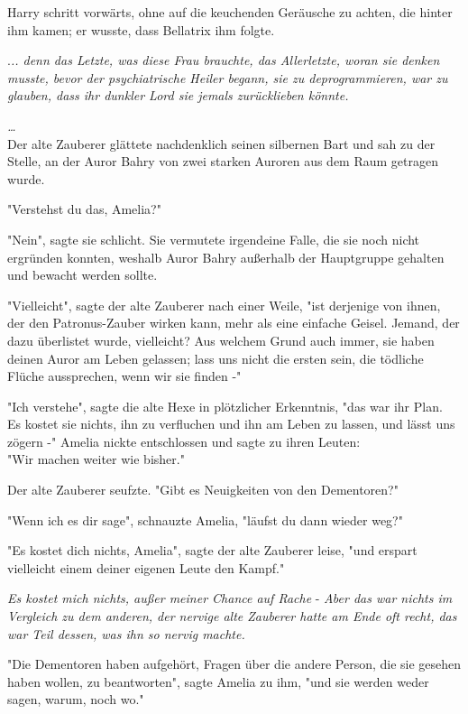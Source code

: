 {Harry schritt vorwärts, ohne auf die keuchenden Geräusche zu achten, die hinter ihm kamen; er wusste, dass Bellatrix ihm folgte.

.\emph{.. denn das Letzte, was diese Frau brauchte, das Allerletzte, woran sie denken musste, bevor der psychiatrische Heiler begann, sie zu deprogrammieren, war zu glauben, dass ihr dunkler Lord sie jemals zurücklieben könnte.}

\emph{…}\\ Der alte Zauberer glättete nachdenklich seinen silbernen Bart und sah zu der Stelle, an der Auror Bahry von zwei starken Auroren aus dem Raum getragen wurde.

"Verstehst du das, Amelia?"

"Nein", sagte sie schlicht. Sie vermutete irgendeine Falle, die sie noch nicht ergründen konnten, weshalb Auror Bahry außerhalb der Hauptgruppe gehalten und bewacht werden sollte.

"Vielleicht", sagte der alte Zauberer nach einer Weile, "ist derjenige von ihnen, der den Patronus-Zauber wirken kann, mehr als eine einfache Geisel. Jemand, der dazu überlistet wurde, vielleicht? Aus welchem Grund auch immer, sie haben deinen Auror am Leben gelassen; lass uns nicht die ersten sein, die tödliche Flüche aussprechen, wenn wir sie finden -"

"Ich verstehe", sagte die alte Hexe in plötzlicher Erkenntnis, "das war ihr Plan.\\ Es kostet sie nichts, ihn zu verfluchen und ihn am Leben zu lassen, und lässt uns zögern -" Amelia nickte entschlossen und sagte zu ihren Leuten:\\ "Wir machen weiter wie bisher."

Der alte Zauberer seufzte. "Gibt es Neuigkeiten von den Dementoren?"

"Wenn ich es dir sage", schnauzte Amelia, "läufst du dann wieder weg?"

"Es kostet dich nichts, Amelia", sagte der alte Zauberer leise, "und erspart vielleicht einem deiner eigenen Leute den Kampf."

\emph{Es kostet mich nichts, außer meiner Chance auf Rache} - \emph{Aber das war nichts im Vergleich zu dem anderen, der nervige alte Zauberer hatte am Ende oft recht, das war Teil dessen, was ihn so nervig machte.}

"Die Dementoren haben aufgehört, Fragen über die andere Person, die sie gesehen haben wollen, zu beantworten", sagte Amelia zu ihm, "und sie werden weder sagen, warum, noch wo."

}

